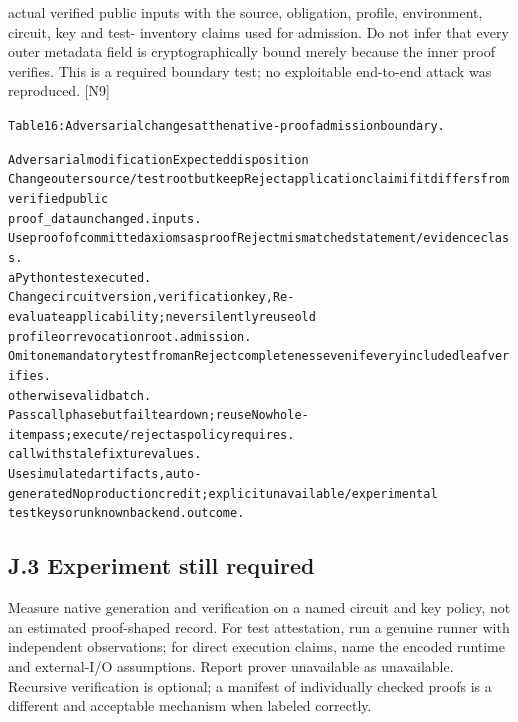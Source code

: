 \documentclass{article}
\begin{document}
actual verified public inputs with the source, obligation, profile, environment, circuit, key and test-
inventory claims used for admission. Do not infer that every outer metadata field is cryptographically
bound merely because the inner proof verifies. This is a required boundary test; no exploitable
end-to-end attack was reproduced. [N9]

\begingroup\fontsize{7}{8.4}\selectfont
\begin{alltt}
Table 16: Adversarial changes at the native-proof admission boundary.
\end{alltt}\endgroup

\begingroup\fontsize{7}{8.4}\selectfont
\begin{alltt}
Adversarial modification                    Expected disposition
Change outer source/test root but keep      Reject application claim if it differs from verified public
proof\_data unchanged.                       inputs.
Use proof of committed axioms as proof      Reject mismatched statement/evidence class.
a Python test executed.
Change circuit version, verification key,   Re-evaluate applicability; never silently reuse old
profile or revocation root.                 admission.
Omit one mandatory test from an             Reject completeness even if every included leaf verifies.
otherwise valid batch.
Pass call phase but fail teardown; reuse    No whole-item pass; execute/reject as policy requires.
call with stale fixture values.
Use simulated artifacts, auto-generated     No production credit; explicit unavailable/experimental
test keys or unknown backend.               outcome.
\end{alltt}\endgroup


\subsection*{J.3 Experiment still required}

Measure native generation and verification on a named circuit and key policy, not an estimated
proof-shaped record. For test attestation, run a genuine runner with independent observations; for
direct execution claims, name the encoded runtime and external-I/O assumptions. Report prover
unavailable as unavailable. Recursive verification is optional; a manifest of individually checked
proofs is a different and acceptable mechanism when labeled correctly.
\end{document}
